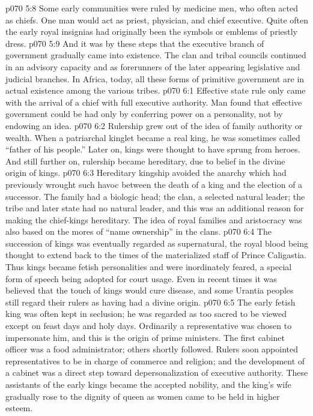 \vs p070 5:8 Some early communities were ruled by medicine men, who often acted as chiefs. One man would act as priest, physician, and chief executive. Quite often the early royal insignias had originally been the symbols or emblems of priestly dress.
\vs p070 5:9 And it was by these steps that the executive branch of government gradually came into existence. The clan and tribal councils continued in an advisory capacity and as forerunners of the later appearing legislative and judicial branches. In Africa, today, all these forms of primitive government are in actual existence among the various tribes.
\vs p070 6:1 Effective state rule only came with the arrival of a chief with full executive authority. Man found that effective government could be had only by conferring power on a personality, not by endowing an idea.
\vs p070 6:2 Rulership grew out of the idea of family authority or wealth. When a patriarchal kinglet became a real king, he was sometimes called “father of his people.” Later on, kings were thought to have sprung from heroes. And still further on, rulership became hereditary, due to belief in the divine origin of kings.
\vs p070 6:3 Hereditary kingship avoided the anarchy which had previously wrought such havoc between the death of a king and the election of a successor. The family had a biologic head; the clan, a selected natural leader; the tribe and later state had no natural leader, and this was an additional reason for making the chief\hyp{}kings hereditary. The idea of royal families and aristocracy was also based on the mores of “name ownership” in the clans.
\vs p070 6:4 The succession of kings was eventually regarded as supernatural, the royal blood being thought to extend back to the times of the materialized staff of Prince Caligastia. Thus kings became fetish personalities and were inordinately feared, a special form of speech being adopted for court usage. Even in recent times it was believed that the touch of kings would cure disease, and some Urantia peoples still regard their rulers as having had a divine origin.
\vs p070 6:5 The early fetish king was often kept in seclusion; he was regarded as too sacred to be viewed except on feast days and holy days. Ordinarily a representative was chosen to impersonate him, and this is the origin of prime ministers. The first cabinet officer was a food administrator; others shortly followed. Rulers soon appointed representatives to be in charge of commerce and religion; and the development of a cabinet was a direct step toward depersonalization of executive authority. These assistants of the early kings became the accepted nobility, and the king’s wife gradually rose to the dignity of queen as women came to be held in higher esteem.
